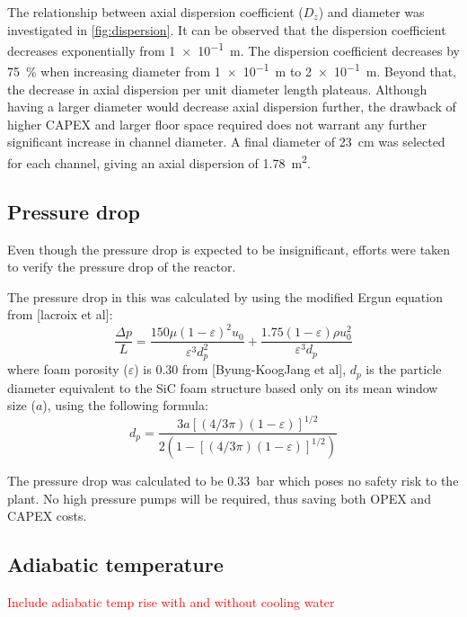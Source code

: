 The relationship between axial dispersion coefficient ($D_z$) and diameter was investigated in \cref{fig:dispersion}. It can be observed that the dispersion coefficient decreases exponentially from \SI{1e-1}{\m}. The dispersion coefficient decreases by \SI{75}{\%} when increasing diameter from \SI{1e-1}{\m} to \SI{2e-1}{\m}. Beyond that, the decrease in axial dispersion per unit diameter length plateaus. Although having a larger diameter would decrease axial dispersion further, the drawback of higher CAPEX and larger floor space required does not warrant any further significant increase in channel diameter. A final diameter of \SI{23}{\cm} was selected for each channel, giving an axial dispersion of \SI{1.78}{\metre \squared}. 
\subsection{Pressure drop}
Even though the pressure drop is expected to be insignificant, efforts were taken to verify the pressure drop of the reactor.

The pressure drop in this was calculated by using the modified Ergun equation from [lacroix et al]: 
\begin{equation}
    \frac{\Delta p}{L} = \frac{150 \mu (1- \varepsilon)^2 u_0}{\varepsilon^3 d_p^2} + \frac{1.75(1-\varepsilon)\rho u_0^2}{\varepsilon^3 d_p}
    \label{eqn:ergun}
\end{equation}
where foam porosity ($\varepsilon$) is 0.30 from  [Byung-KoogJang et al], $d_p$ is the particle diameter equivalent to the SiC foam structure based only on its mean window size ($a$), using the following formula:
\begin{equation}
d_{p}=\frac{3a[(4 / 3 \pi)(1-\varepsilon)]^{1 / 2}}{2(1-[(4 / 3 \pi)(1-\varepsilon)]^{1 / 2})}
\end{equation}

The pressure drop was calculated to be \SI{0.33}{\bar} which poses no safety risk to the plant. No high pressure pumps will be required, thus saving both OPEX and CAPEX costs.


\subsection{Adiabatic temperature}

\textcolor{red}{Include adiabatic temp rise with and without cooling water}

